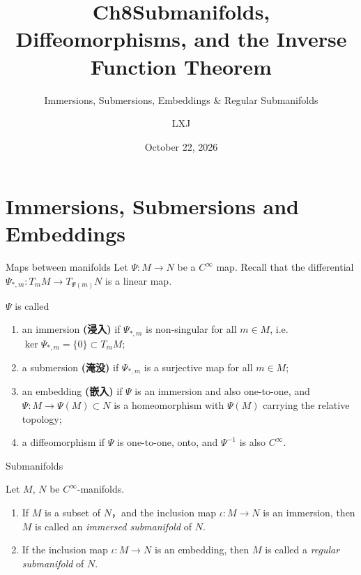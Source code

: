 \documentclass[10pt]{beamer}
\title{Ch8\quad Submanifolds, Diffeomorphisms, and the Inverse Function Theorem}
\subtitle{Immersions, Submersions, Embeddings \& Regular Submanifolds}
\date{October 22, 2026}
\author{LXJ}
\begin{document}
\maketitle

\section{Immersions, Submersions and Embeddings}

\begin{frame}{Maps between manifolds}
	Let $\Psi : M \to N$ be a $C^\infty$ map. Recall that the
	differential $\Psi_{*,m} : T_m M \to T_{\Psi(m)} N$ is a linear map.
	\begin{definition}
		$\Psi$ is called
		\begin{enumerate}
			\item an \alert{immersion} \textbf{(浸入)} if $\Psi_{*,m}$
			      is non-singular for all $m \in M$, i.e.\
			      $\ker \Psi_{*,m} = \{0\} \subset T_m M$;
			\item a \alert{submersion} \textbf{(淹没)} if $\Psi_{*,m}$
			      is a surjective map for all $m \in M$;
			\item an \alert{embedding} \textbf{(嵌入)} if $\Psi$ is an
			      immersion and also one-to-one, and
			      $\Psi : M \to \Psi(M) \subset N$ is a homeomorphism
			      with $\Psi(M)$ carrying the relative topology;
			\item a \alert{diffeomorphism} if $\Psi$ is one-to-one,
			      onto, and $\Psi^{-1}$ is also $C^\infty$.
		\end{enumerate}
	\end{definition}
\end{frame}

\begin{frame}{Submanifolds}
	\begin{definition}
		Let $M$, $N$ be $C^\infty$-manifolds.
		\begin{enumerate}
			\item If $M$ is a subset of $N$，and
			      the inclusion map $\iota: M\to N$ is an immersion, then $M$ is called
			      an \emph{immersed  submanifold} of $N$.
			\item If the inclusion map
			      $\iota: M\to N$ is an embedding, then $M$ is called a \emph{regular
				      submanifold} of $N$.
		\end{enumerate}
	\end{definition}
\end{frame}
\end{document}
